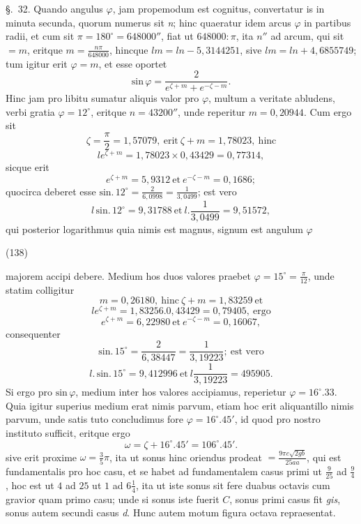 \documentclass[11pt,a4paper]{article}
\begin{document}
§.~32. Quando angulus $\varphi$, jam propemodum est cognitus, convertatur is in
minuta secunda, quorum numerus sit \emph{n}; hinc quaeratur idem arcus $\varphi$ in
partibus radii, et cum sit $\pi = 180^\circ = 648000''$, fiat ut
$648000 : \pi$, ita $n''$ ad arcum, qui sit $= m$, eritque
$m = \frac{n\pi}{648000}$, hincque $lm = ln - 5{,}3144251$, sive
$lm = ln + 4{,}6855749$; tum igitur erit $\varphi = m$, et esse oportet
\[
\text{sin}\,\varphi = \frac{2}{e^{\zeta + m} + e^{-\zeta - m}}.
\]
Hinc jam pro libitu sumatur aliquis valor pro $\varphi$, multum a veritate abludens,
verbi gratia $\varphi = 12^\circ$, eritque $n = 43200''$, unde reperitur
$m = 0{,}20944$. Cum ergo sit
\[
\zeta = \frac{\pi}{2} = 1{,}57079, \ \text{erit}\ \zeta + m = 1{,}78023, \ \text{hinc}
\]
\[
le^{\zeta + m} = 1{,}78023 \times 0{,}43429 = 0{,}77314,
\]
sicque erit
\[
e^{\zeta + m} = 5{,}9312 \ \text{et}\ e^{-\zeta - m} = 0{,}1686;
\]
quocirca deberet esse
$\text{sin}.\,12^\circ = \frac{2}{6{,}0998} = \frac{1}{3{,}0499}$; est vero
\[
l\,\text{sin}.\,12^\circ = 9{,}31788 \ \text{et}\ l.\frac{1}{3{,}0499} = 9{,}51572,
\]
qui posterior logarithmus quia nimis est magnus, signum est angulum $\varphi$

(138)

majorem accipi debere. Medium hos duos valores praebet
$\varphi = 15^\circ = \frac{\pi}{12}$, unde statim colligitur
\[
m = 0{,}26180, \ \text{hinc}\ \zeta + m = 1{,}83259 \ \text{et}
\]
\[
le^{\zeta + m} = 1{,}83256.0{,}43429 = 0{,}79405, \ \text{ergo}
\]
\[
e^{\zeta + m} = 6{,}22980 \ \text{et}\ e^{-\zeta - m} = 0{,}16067,
\]
consequenter
\[
\text{sin}.\,15^\circ = \frac{2}{6{,}38447} = \frac{1}{3{,}19223}; \ \text{est vero}
\]
\[
l.\,\text{sin}.\,15^\circ = 9{,}412996 \ \text{et}\ l\frac{1}{3{,}19223} = 495905.
\]
Si ergo pro $\text{sin}\,\varphi$, medium inter hos valores accipiamus, reperietur
$\varphi = 16^\circ.33$. Quia igitur superius medium erat nimis parvum, etiam hoc erit
aliquantillo nimis parvum, unde satis tuto concludimus fore $\varphi = 16^\circ.45'$,
id quod pro nostro instituto sufficit, eritque ergo
\[
\omega = \zeta + 16^\circ.45' = 106^\circ.45'.
\]
sive erit proxime $\omega = \frac{3}{5}\pi$, ita ut sonus hinc oriendus prodeat
$= \frac{9\pi c\sqrt{2gb}}{25aa}$, qui est fundamentalis pro hoc casu, et se habet ad
fundamentalem casus primi ut $\frac{9}{25}$ ad $\frac{9}{4}$, hoc est ut $4$ ad $25$ ut
$1$ ad $6\frac{1}{4}$, ita ut iste sonus sit fere duabus octavis cum
 gravior quam primo casu; unde si sonus iste fuerit $C$, sonus primi
casus fit \emph{gis}, sonus autem secundi casus \emph{d}. Hunc autem motum figura
octava repraesentat.
\end{document}
